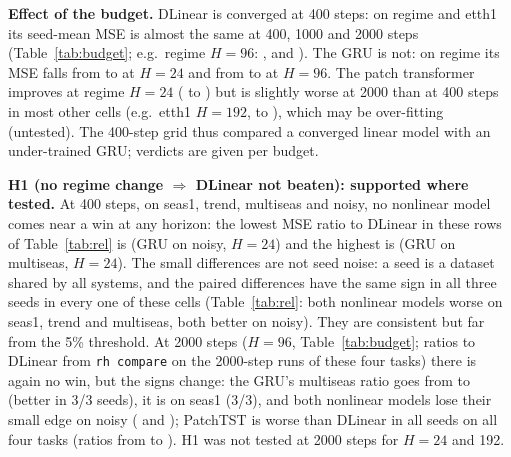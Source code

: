 \textbf{Effect of the budget.} DLinear is converged at 400 steps: on regime and etth1 its seed-mean MSE is almost the same at 400, 1000 and 2000 steps (Table~\ref{tab:budget}; e.g.\ regime $H=96$: ,  and ). The GRU is not: on regime its MSE falls from  to  at $H=24$ and from  to  at $H=96$. The patch transformer improves at regime $H=24$ ( to ) but is slightly worse at 2000 than at 400 steps in most other cells (e.g.\ etth1 $H=192$,  to ), which may be over-fitting (untested). The 400-step grid thus compared a converged linear model with an under-trained GRU; verdicts are given per budget.

\textbf{H1 (no regime change $\Rightarrow$ DLinear not beaten): supported where tested.} At 400 steps, on seas1, trend, multiseas and noisy, no nonlinear model comes near a win at any horizon: the lowest MSE ratio to DLinear in these rows of Table~\ref{tab:rel} is  (GRU on noisy, $H=24$) and the highest is  (GRU on multiseas, $H=24$). The small differences are not seed noise: a seed is a dataset shared by all systems, and the paired differences have the same sign in all three seeds in every one of these cells (Table~\ref{tab:rel}: both nonlinear models worse on seas1, trend and multiseas, both better on noisy). They are consistent but far from the 5\% threshold. At 2000 steps ($H=96$, Table~\ref{tab:budget}; ratios to DLinear from \texttt{rh compare} on the 2000-step runs of these four tasks) there is again no win, but the signs change: the GRU's multiseas ratio goes from  to  (better in 3/3 seeds), it is  on seas1 (3/3), and both nonlinear models lose their small edge on noisy ( and ); PatchTST is worse than DLinear in all seeds on all four tasks (ratios from  to ). H1 was not tested at 2000 steps for $H=24$ and 192.

